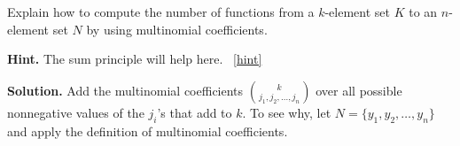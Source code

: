 \documentclass{book}
\begin{document}
\setcounter{project}{282}
\addtocounter{project}{-1}
\begin{activity}[]\label{activity-275}
\hypertarget{p-1459}{}%
Explain how to compute the number of functions from a \(k\)-element set \(K\) to an \(n\)-element set \(N\) by using multinomial coefficients.%
\par\smallskip%
\noindent\textbf{Hint.}\hypertarget{hint-184}{}\quad%
\hypertarget{p-1460}{}%
The sum principle will help here.%
~\hfill{\tiny\hyperlink{a-282}{[hint]}\hypertarget{q-282}{}}\par\smallskip%
\noindent\textbf{Solution.}\hypertarget{solution-195}{}\quad%
\hypertarget{p-1461}{}%
Add the multinomial coefficients \(\binom{k}{j_1,j_2,\ldots,j_n}\) over all possible nonnegative values of the \(j_i\)'s that add to \(k\).  To see why, let \(N=\{y_1,y_2,\ldots,y_n\}\) and apply the definition of multinomial coefficients.%
\end{activity}
\end{document}
